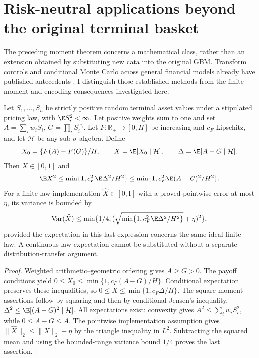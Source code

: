 \section{Risk-neutral applications beyond the original terminal basket}
\label{sec:moment-applications}

The preceding moment theorem concerns a mathematical class, rather than an
extension obtained by substituting new data into the original GBM. Transform
controls and conditional Monte Carlo across general financial models already
have published antecedents \citep{dingec}. I distinguish those established
methods from the finite-moment and encoding consequences investigated here.

\begin{theorem}
\label{thm:positive-asset-moment}
Let $S_1,\ldots,S_n$ be strictly positive random terminal asset values
under a stipulated pricing law, with $\E S_i^2<\infty$. Let positive
weights sum to one and set $A=\sum_iw_iS_i$, $G=\prod_iS_i^{w_i}$.
Let $F:\mathbb R_+\to[0,H]$ be increasing and $c_F$-Lipschitz,
and let $\mathcal H$ be any sub-$\sigma$-algebra. Define
\begin{equation}
 X_0=\{F(A)-F(G)\}/H,\qquad
 X=\E[X_0\mid\mathcal H],\qquad
 \Delta=\E[A-G\mid\mathcal H].
\end{equation}
Then $X\in[0,1]$ and
\begin{equation}
 \E X^2\leq\min\{1,c_F^2\E\Delta^2/H^2\}
 \leq\min\{1,c_F^2\E(A-G)^2/H^2\}.
\end{equation}
For a finite-law implementation $\widehat X\in[0,1]$ with a
proved pointwise error at most $\eta$, its variance is bounded by
\begin{equation}
 \operatorname{Var}(\widehat X)
 \leq\min\{1/4,(\sqrt{\min\{1,c_F^2\E\Delta^2/H^2\}}+\eta)^2\},
\end{equation}
provided the expectation in this last expression concerns the same
ideal finite law. A continuous-law expectation cannot be substituted
without a separate distribution-transfer argument.
\end{theorem}

\begin{proof}
Weighted arithmetic--geometric ordering gives $A\geq G>0$.
The payoff conditions yield
$0\leq X_0\leq\min\{1,c_F(A-G)/H\}$.
Conditional expectation preserves these inequalities, so
$0\leq X\leq\min\{1,c_F\Delta/H\}$.
The square-moment assertions follow by squaring and then by conditional
Jensen's inequality, $\Delta^2\leq\E[(A-G)^2\mid\mathcal H]$.
All expectations exist: convexity gives
$A^2\leq\sum_iw_iS_i^2$, while $0\leq A-G\leq A$.
The pointwise implementation assumption gives
$\|\widehat X\|_2\leq\|X\|_2+\eta$ by the triangle inequality
in $L^2$. Subtracting the squared mean and using the bounded-range
variance bound $1/4$ proves the last assertion.
\end{proof}

